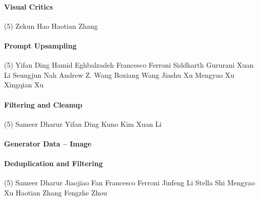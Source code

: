 \vspace{-0.32\baselineskip}\paragraph{\footnotesize Visual Critics} \mbox{}
\vspace{-0.32\baselineskip}
\begingroup
\footnotesize
\begin{tasks}[label=\relax, label-width=0pt, item-indent=4pt](5)
\task Zekun Hao 
\task Haotian Zhang 
\end{tasks}
\endgroup

\vspace{-0.32\baselineskip}\paragraph{\footnotesize Prompt Upsampling} \mbox{}
\vspace{-0.32\baselineskip}
\begingroup
\footnotesize
\begin{tasks}[label=\relax, label-width=0pt, item-indent=4pt](5)
\task Yifan Ding
\task Hamid Eghbalzadeh
\task Francesco Ferroni
\task Siddharth Gururani
\task Xuan Li
\task Seungjun Nah
\task Andrew Z. Wang
\task Boxiang Wang
\task Jiashu Xu
\task Mengyao Xu
\task Xingqian Xu
\end{tasks}
\endgroup

\vspace{-0.32\baselineskip}\paragraph{\footnotesize Filtering and Cleanup} \mbox{}
\vspace{-0.32\baselineskip}
\begingroup
\footnotesize
\begin{tasks}[label=\relax, label-width=0pt, item-indent=4pt](5)
\task Sameer Dharur
\task Yifan Ding
\task Kuno Kim
\task Xuan Li
\end{tasks}
\endgroup

\paragraph{Generator Data -- Image} \mbox{}
\paragraph{\footnotesize Deduplication and Filtering} \mbox{}
\vspace{-0.32\baselineskip}
\begingroup
\footnotesize
\begin{tasks}[label=\relax, label-width=0pt, item-indent=4pt](5)
\task Sameer Dharur
\task Jiaojiao Fan
\task Francesco Ferroni
\task Jinfeng Li
\task Stella Shi
\task Mengyao Xu
\task Haotian Zhang
\task Fengzhe Zhou
\end{tasks}
\endgroup

